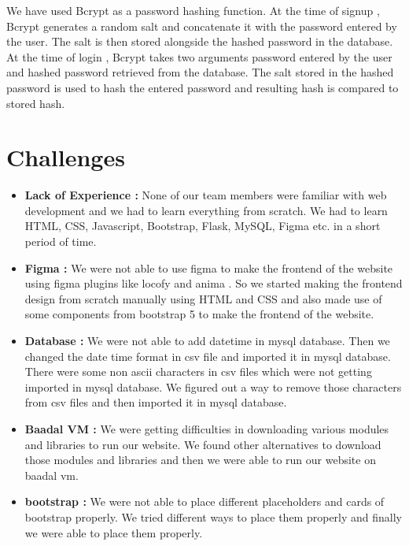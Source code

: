 \documentclass{article}
\begin{document}
We have used Bcrypt as a password hashing function.
At the time of signup , Bcrypt generates a random salt and concatenate it with the password entered by the user. The salt is then stored alongside the hashed password in the database.
At the time of login , Bcrypt takes two arguments password entered by the user and hashed password retrieved from the database. The salt stored in the hashed password is used to hash the entered password and resulting hash is compared to stored hash.
\section{Challenges}
\begin{itemize}
    \item \textbf{Lack of Experience :} None of our team members were familiar with web development and we had to learn everything from scratch. We had to learn HTML, CSS, Javascript, Bootstrap, Flask, MySQL, Figma etc. in a short period of time.
    \item \textbf{Figma :} We were not able to use figma to make the frontend of the website using figma plugins like locofy and anima . So we started making the frontend design from scratch manually using HTML and CSS and also made use of some components from  bootstrap 5 to make the frontend of the website.
    \item \textbf{Database :} We were not able to add datetime in mysql database. Then we changed the date time format in csv file and imported it in mysql database. There were some non ascii characters in csv files which were not getting imported in mysql database. We figured out a way to remove those characters from csv files and then imported it in mysql database.
    \item \textbf{Baadal VM :} We were getting difficulties in downloading various modules and libraries to run our website. We found other alternatives to download those modules and libraries and then we were able to run our website on baadal vm.
    \item \textbf{bootstrap :} We were not able to place different placeholders and cards of bootstrap properly. We tried different ways to place them properly and finally we were able to place them properly.
\end{itemize}
\end{document}

